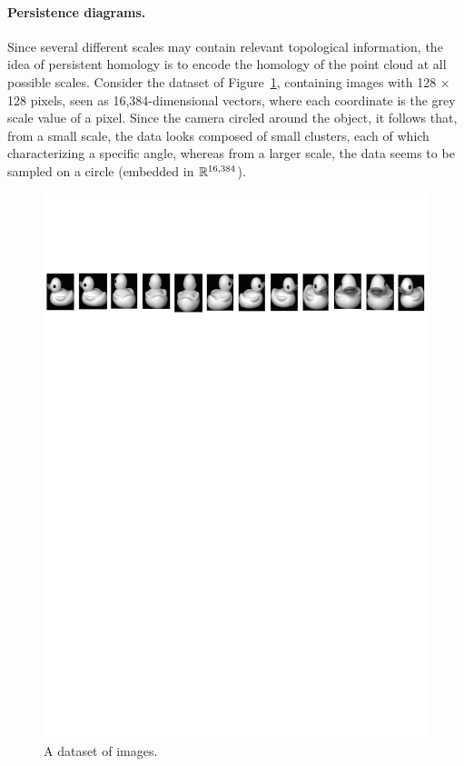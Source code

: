\paragraph*{Persistence diagrams.} 
Since several different scales may contain relevant topological information, the idea of persistent homology
is to encode the homology of the point cloud at all possible scales. Consider the dataset of Figure~\ref{fig:dataset},
containing images with 128 $\times$ 128 pixels, seen as 16,384-dimensional vectors, where each coordinate is the grey scale value of a pixel.
Since the camera circled around the object, 
it follows that, from a small scale, the data looks 
composed of small clusters, each of which characterizing a specific angle, whereas from a larger scale, 
the data seems to be sampled on a circle (embedded in $\mathbb{R}^{16,384}$).

\begin{figure}[h]\centering
\includegraphics[width=\textwidth]{figures/ExampleDataset}
\caption{\label{fig:dataset} A dataset of images.}
\end{figure}


